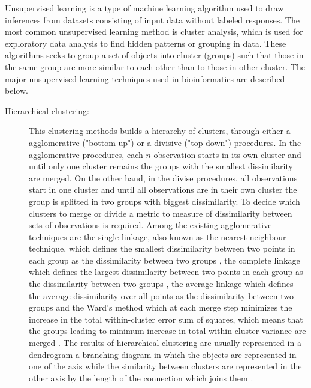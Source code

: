 Unsupervised learning is a type of machine learning algorithm used to draw inferences from datasets consisting of input data without labeled responses.
The most common unsupervised learning method is cluster analysis, which is used for exploratory data analysis to find hidden patterns or grouping in data. These algorithms seeks to group a set of objects into cluster (groups) such that those in the same group are more similar to each other than to those in other cluster.
The major unsupervised learning techniques used in bioinformatics are described below.
\begin{description}

\item[Hierarchical clustering:] {This clustering methods builds a hierarchy of clusters, through either a agglomerative ("bottom up") or a divisive ("top down") procedures.
In the agglomerative procedures, each $n$ observation starts in its own cluster and until only one cluster remains the groups with the smallest dissimilarity are merged.
On the other hand, in the divise procedures, all observations start in one cluster and until all observations are in their own cluster the group is splitted in two groups with biggest dissimilarity. To decide which clusters to merge or divide a metric to measure of dissimilarity between sets of observations is required.
Among the existing agglomerative techniques are the single linkage, also known as the nearest-neighbour technique, which defines the smallest dissimilarity between two points in each group as the dissimilarity between two groups \cite{florek1951liaison}, the complete linkage which defines the largest dissimilarity between two points in each group as the dissimilarity between two groups \cite{defays1977efficient}, the average linkage which defines the average dissimilarity over all points as the dissimilarity between two groups \cite{sokal1958statistical} and the Ward’s method which at each merge step minimizes the increase in the total within-cluster error sum of
squares, which means that  the groups leading to minimum increase in total within-cluster variance are merged \cite{ward1963hierarchical,everitt2011hierarchical}.
The results of hierarchical clustering are usually represented in a dendrogram a branching diagram in which the objects are represented in one of the axis while the similarity between clusters are represented in the other axis by the length of the connection which joins them \cite{manning1999foundations}.}


\end{description}
